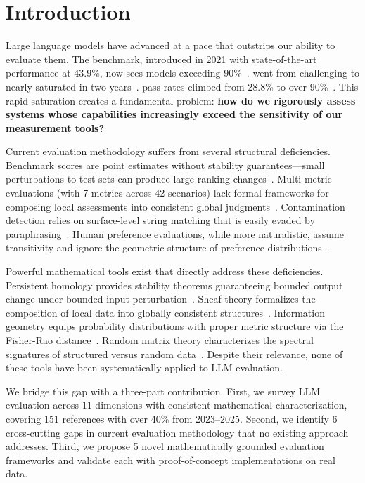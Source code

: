 \section{Introduction}
\label{sec:intro}

Large language models have advanced at a pace that outstrips our ability to evaluate them.
The \mmlu benchmark, introduced in 2021 with state-of-the-art performance at 43.9\%, now sees models exceeding 90\%~\citep{hendrycks2021mmlu, openai2023gpt4}.
\gsmk went from challenging to nearly saturated in two years~\citep{cobbe2021gsm8k}.
\humaneval pass rates climbed from 28.8\% to over 90\%~\citep{chen2021evaluating}.
This rapid saturation creates a fundamental problem: {\bf how do we rigorously assess systems whose capabilities increasingly exceed the sensitivity of our measurement tools?}

Current evaluation methodology suffers from several structural deficiencies.
Benchmark scores are point estimates without stability guarantees---small perturbations to test sets can produce large ranking changes~\citep{dehghani2021benchmark}.
Multi-metric evaluations (\eg \helm with 7 metrics across 42 scenarios) lack formal frameworks for composing local assessments into consistent global judgments~\citep{liang2022helm}.
Contamination detection relies on surface-level string matching that is easily evaded by paraphrasing~\citep{yang2023rethinking}.
Human preference evaluations, while more naturalistic, assume transitivity and ignore the geometric structure of preference distributions~\citep{chiang2024chatbot}.

Powerful mathematical tools exist that directly address these deficiencies.
Persistent homology provides stability theorems guaranteeing bounded output change under bounded input perturbation~\citep{cohen2007stability, chazal2021introduction}.
Sheaf theory formalizes the composition of local data into globally consistent structures~\citep{bredon1997sheaf, curry2014sheaves}.
Information geometry equips probability distributions with proper metric structure via the Fisher-Rao distance~\citep{amari2016information, nielsen2020elementary}.
Random matrix theory characterizes the spectral signatures of structured versus random data~\citep{marchenkopastur1967, tracy1996orthogonal}.
Despite their relevance, none of these tools have been systematically applied to LLM evaluation.

We bridge this gap with a three-part contribution.
First, we survey LLM evaluation across 11 dimensions with consistent mathematical characterization, covering 151 references with over 40\% from 2023--2025.
Second, we identify 6 cross-cutting gaps in current evaluation methodology that no existing approach addresses.
Third, we propose 5 novel mathematically grounded evaluation frameworks and validate each with proof-of-concept implementations on real \mmlu data.

